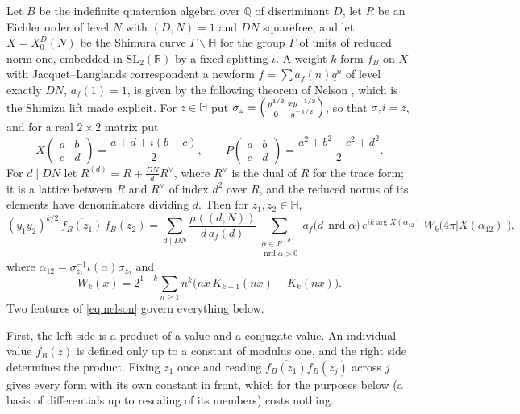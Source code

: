 \documentclass[11pt,reqno]{amsart}
\theoremstyle{plain}
\theoremstyle{definition}
\DeclareMathOperator{\nrd}{nrd}
\newcommand{\Q}{\mathbb{Q}}
\newcommand{\R}{\mathbb{R}}
\newcommand{\HH}{\mathbb{H}}
\begin{document}
Let $B$ be the indefinite quaternion algebra over $\Q$ of discriminant $D$, let $R$ be an Eichler
order of level $N$ with $(D,N)=1$ and $DN$ squarefree, and let $X=X_0^D(N)$ be the Shimura curve
$\Gamma\backslash\HH$ for the group $\Gamma$ of units of reduced norm one, embedded in
$\mathrm{SL}_2(\R)$ by a fixed splitting $\iota$. A weight-$k$ form $f_B$ on $X$ with
Jacquet--Langlands correspondent a newform $f=\sum a_f(n)q^n$ of level exactly $DN$, $a_f(1)=1$,
is given by the following theorem of Nelson \cite[Theorem~3.1]{Nelson}, which is the Shimizu
lift made explicit. For $z\in\HH$ put $\sigma_z=\begin{psmallmatrix} y^{1/2} & x y^{-1/2}\\ 0 &
y^{-1/2}\end{psmallmatrix}$, so that $\sigma_z i = z$, and for a real $2\times 2$ matrix put
\[
X\!\begin{pmatrix} a & b\\ c & d\end{pmatrix} = \frac{a+d+i(b-c)}{2},
\qquad
P\!\begin{pmatrix} a & b\\ c & d\end{pmatrix} = \frac{a^2+b^2+c^2+d^2}{2}.
\]
For $d\mid DN$ let $R^{(d)}=R+\tfrac{DN}{d}R^\vee$, where $R^\vee$ is the dual of $R$ for the
trace form; it is a lattice between $R$ and $R^\vee$ of index $d^2$ over $R$, and the reduced
norms of its elements have denominators dividing $d$. Then for $z_1,z_2\in\HH$,
\begin{equation}\label{eq:nelson}
(y_1y_2)^{k/2}\,\overline{f_B(z_1)}\,f_B(z_2)
= \sum_{d\mid DN}\frac{\mu((d,N))}{d\,a_f(d)}
\sum_{\substack{\alpha\in R^{(d)}\\ \nrd\alpha>0}}
a_f\big(d\,\nrd\alpha\big)\,e^{ik\arg X(\alpha_{12})}\,W_k\big(4\pi\lvert X(\alpha_{12})\rvert\big),
\end{equation}
where $\alpha_{12}=\sigma_{z_1}^{-1}\iota(\alpha)\sigma_{z_2}$ and
\[
W_k(x)=2^{1-k}\sum_{n\ge 1} n^k\big(nx\,K_{k-1}(nx)-K_k(nx)\big).
\]
Two features of \eqref{eq:nelson} govern everything below.

First, the left side is a product of a value and a conjugate value. An individual value
$f_B(z)$ is defined only up to a constant of modulus one, and the right side determines the
product. Fixing $z_1$ once and reading $\overline{f_B(z_1)}f_B(z_j)$ across $j$ gives every form
with its own constant in front, which for the purposes below (a basis of differentials up to
rescaling of its members) costs nothing.
\end{document}

